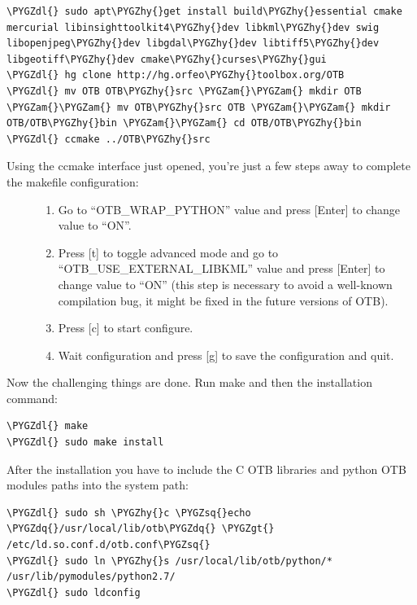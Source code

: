\documentclass[letterpaper,10pt,english]{sphinxmanual}
\def\PYGZam{\char`\&}
\def\PYGZgt{\char`\>}
\def\PYGZdl{\char`\$}
\def\PYGZhy{\char`\-}
\def\PYGZsq{\char`\'}
\def\PYGZdq{\char`\"}
\renewcommand\PYGZsq{\textquotesingle}
\begin{document}
\begin{description}
\begin{Verbatim}[frame=single,commandchars=\\\{\}]
\PYGZdl{} sudo apt\PYGZhy{}get install build\PYGZhy{}essential cmake mercurial libinsighttoolkit4\PYGZhy{}dev libkml\PYGZhy{}dev swig libopenjpeg\PYGZhy{}dev libgdal\PYGZhy{}dev libtiff5\PYGZhy{}dev libgeotiff\PYGZhy{}dev cmake\PYGZhy{}curses\PYGZhy{}gui
\PYGZdl{} hg clone http://hg.orfeo\PYGZhy{}toolbox.org/OTB
\PYGZdl{} mv OTB OTB\PYGZhy{}src \PYGZam{}\PYGZam{} mkdir OTB \PYGZam{}\PYGZam{} mv OTB\PYGZhy{}src OTB \PYGZam{}\PYGZam{} mkdir OTB/OTB\PYGZhy{}bin \PYGZam{}\PYGZam{} cd OTB/OTB\PYGZhy{}bin
\PYGZdl{} ccmake ../OTB\PYGZhy{}src
\end{Verbatim}
\begin{description}
\item[{Using the ccmake interface just opened, you're just a few steps away to complete the makefile configuration:}] \leavevmode\begin{enumerate}
\item {} 
Go to “OTB\_WRAP\_PYTHON” value and press {[}Enter{]} to change value to “ON”.

\item {} 
Press {[}t{]} to toggle advanced mode and go to “OTB\_USE\_EXTERNAL\_LIBKML” value and press {[}Enter{]} to change value to “ON” (this step is necessary to avoid a well-known compilation bug, it might be fixed in the future versions of OTB).

\item {} 
Press {[}c{]} to start configure.

\item {} 
Wait configuration and press {[}g{]} to save the configuration and quit.

\end{enumerate}

\end{description}

Now the challenging things are done. Run make and then the installation command:

\begin{Verbatim}[frame=single,commandchars=\\\{\}]
\PYGZdl{} make
\PYGZdl{} sudo make install
\end{Verbatim}

After the installation you have to include the C OTB libraries and python OTB modules paths into the system path:

\begin{Verbatim}[frame=single,commandchars=\\\{\}]
\PYGZdl{} sudo sh \PYGZhy{}c \PYGZsq{}echo \PYGZdq{}/usr/local/lib/otb\PYGZdq{} \PYGZgt{} /etc/ld.so.conf.d/otb.conf\PYGZsq{}
\PYGZdl{} sudo ln \PYGZhy{}s /usr/local/lib/otb/python/* /usr/lib/pymodules/python2.7/
\PYGZdl{} sudo ldconfig
\end{Verbatim}

\end{description}
\end{document}
